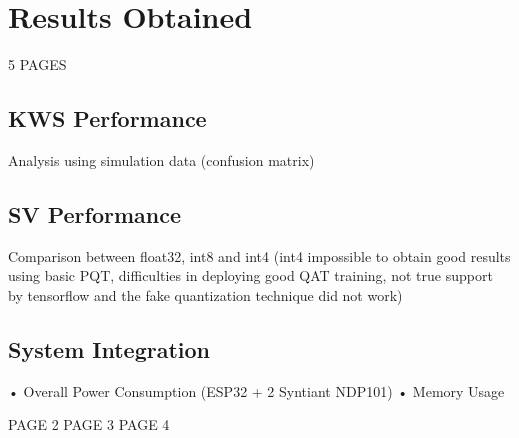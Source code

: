 \chapter{Results Obtained}
\label{cha:results obtained}

5 PAGES\newline\newline


\section{KWS Performance}
\label{sec:kws performance}
Analysis using simulation data (confusion matrix)\newline 
\section{SV Performance}
\label{sec:sv performance}
Comparison between float32, int8 and int4 (int4 impossible to obtain good results using basic PQT, difficulties in deploying good QAT training, not true support by tensorflow and the fake quantization technique did not work)\newline 
\section{System Integration}
\label{sec: system integration}
• Overall Power Consumption (ESP32 + 2 Syntiant NDP101)\newline
• Memory Usage\newline

\newpage
\newpage
PAGE 2
\newpage
PAGE 3
\newpage
PAGE 4
\newpage